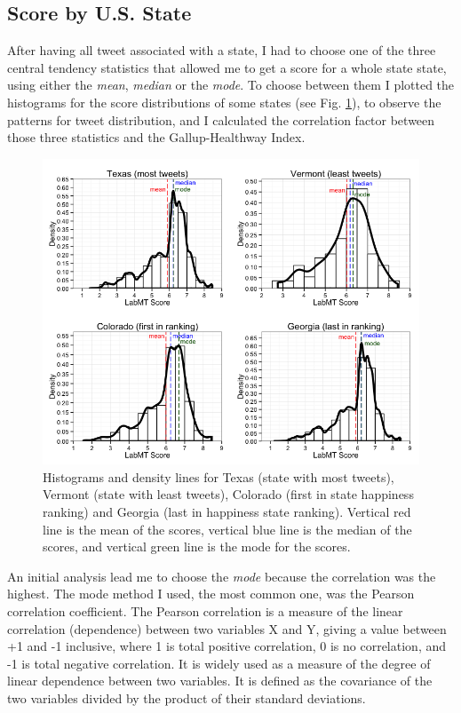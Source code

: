 \documentclass{llncs}
\begin{document}
\subsection{Score by U.S. State}
\label{sec:meth4}
After having all tweet associated with a state, I had to choose one of the three central tendency statistics that allowed me to get a score for a whole state state, using either the \emph{mean}, \emph{median} or the \emph{mode}. To choose between them I plotted the histograms for the score distributions of some states (see Fig. \ref{fig:tweets_distribution}), to observe the patterns for tweet distribution, and I calculated the correlation factor between those three statistics and the Gallup-Healthway Index.

\begin{figure}
\centering
\includegraphics[width=\textwidth]{images/tweets_distribution}
\caption{Histograms and density lines for Texas (state with most tweets), Vermont (state with least tweets), Colorado (first in state happiness ranking) and Georgia (last in happiness state ranking). Vertical red line is the mean of the scores, vertical blue line is the median of the scores, and vertical green line is the mode for the scores.}
\label{fig:tweets_distribution}
\end{figure}

An initial analysis lead me to choose the \emph{mode} because the correlation was the highest. The mode method I used, the most common one, was the Pearson correlation coefficient. The Pearson correlation is a measure of the linear correlation (dependence) between two variables X and Y, giving a value between +1 and -1 inclusive, where 1 is total positive correlation, 0 is no correlation, and -1 is total negative correlation. It is widely used as a measure of the degree of linear dependence between two variables. It is defined as the covariance of the two variables divided by the product of their standard deviations. \cite{Pearson2006}
\end{document}
